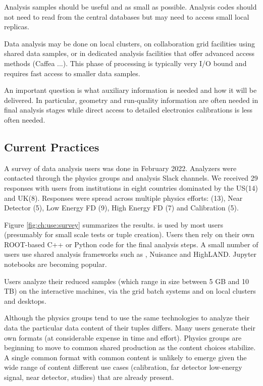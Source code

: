 \documentclass[../main-v1.tex]{subfiles}
\begin{document}
Analysis samples should be useful and as small as possible.  Analysis codes should not need to read from the central databases but may need to access small local replicas. 

Data analysis may be done on local clusters, on collaboration grid facilities using shared data samples, or in dedicated analysis facilities that offer advanced access methods (Caffea ...).  This phase of processing is typically very I/O bound and requires fast access to smaller data samples. 


An important question is what auxiliary information is needed and how it will be delivered. In particular, geometry and run-quality information are often needed in final analysis stages while direct access to detailed electronics calibrations is less often needed. 

\subsection{Current Practices}

A survey of data analysis users was done in February 2022.  Analyzers were contacted through the physics groups and analysis Slack channels.  We received 29 responses with users from institutions in eight countries dominated by the US(14) and UK(8). 
Responses were spread across multiple physics efforts: 	(13),
Near Detector	(5),
Low Energy FD	(9),
High Energy FD	(7) and 
Calibration	(5).  



Figure \ref{fig:ch:use:survey} summarizes the results.   is used by most users (presumably for small scale tests or tuple creation).  Users then rely on their own ROOT-based C++ or Python code for the final analysis steps.  A small number of users use shared analysis frameworks such as , Nuisance and HighLAND.  Jupyter notebooks are becoming popular. 

Users analyze their reduced samples (which range in size between 5 GB and 10 TB) on the  interactive machines, via the grid batch systems and on local clusters and desktops. 


Although the physics groups tend to use the same technologies to analyze their data the particular data content of their tuples differs.  Many users generate their own formats (at considerable expense in time and effort). Physics groups are beginning to move to common shared production as the content choices stabilize.  A single common format with common content is unlikely to emerge given the wide range of content different use cases (calibration, far detector low-energy signal, near detector,  studies) that are already present.
\end{document}
